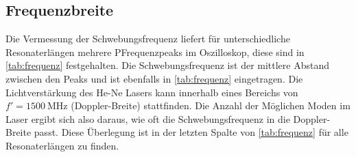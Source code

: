 \subsection{Frequenzbreite}
Die Vermessung der Schwebungsfrequenz liefert für unterschiedliche Resonaterlängen mehrere PFrequenzpeaks im Oszilloskop, diese
sind in \autoref{tab:frequenz} festgehalten. Die Schwebungsfrequenz ist der mittlere Abstand zwischen den
Peaks und ist ebenfalls in \autoref{tab:frequenz} eingetragen.
Die Lichtverstärkung des He-Ne Lasers kann innerhalb eines Bereichs von $f'=\qty{1500}{\mega\hertz}$ (Doppler-Breite) stattfinden.
Die Anzahl der Möglichen Moden im Laser ergibt sich also daraus, wie oft die Schwebungsfrequenz in die Doppler-Breite passt.
Diese Überlegung ist in der letzten Spalte von \autoref{tab:frequenz} für alle Resonaterlängen zu finden.


